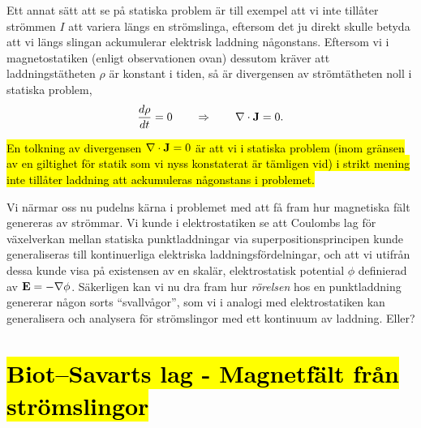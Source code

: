 Ett annat s{\"a}tt att se p{\aa} statiska problem {\"a}r till exempel att vi
inte till{\aa}ter str{\"o}mmen $I$ att variera l{\"a}ngs en str{\"o}mslinga,
eftersom det ju direkt skulle betyda att vi l{\"a}ngs slingan ackumulerar
elektrisk laddning n{\aa}gonstans. Eftersom vi i magnetostatiken (enligt
observationen ovan) dessutom kr{\"a}ver att laddningst{\"a}theten $\rho$
{\"a}r konstant i tiden, s{\aa} {\"a}r divergensen av str{\"o}mt{\"a}theten
noll i statiska problem,
\hl{$$
  {{d\rho}\over{dt}}=0\qquad\Rightarrow\qquad\nabla\cdot{\bf J}=0.
$$}
{\hl{En tolkning av divergensen $\nabla\cdot{\bf J}=0$ {\"a}r att vi i statiska
problem (inom gr{\"a}nsen av en giltighet f{\"o}r statik som vi nyss
konstaterat {\"a}r t{\"a}mligen vid) i strikt mening inte till{\aa}ter
laddning att ackumuleras n{\aa}gonstans i problemet.}

Vi n{\"a}rmar oss nu pudelns k{\"a}rna i problemet med att f{\aa} fram hur
magnetiska f{\"a}lt genereras av str{\"o}mmar.
Vi kunde i elektrostatiken se att Coulombs lag f{\"o}r v{\"a}xelverkan mellan
statiska punktladdningar
via superpositionsprincipen kunde generaliseras till kontinuerliga elektriska
laddningsf{\"o}rdelningar, och att vi utifr{\aa}n dessa kunde visa p{\aa}
existensen av en skal{\"a}r, elektrostatisk potential $\phi$ definierad av
${\bf E}=-\nabla\phi$. S{\"a}kerligen kan vi nu dra fram hur {\it r{\"o}relsen}
hos en punktladdning genererar n{\aa}gon sorts ``svallv{\aa}gor'', som vi i
analogi med elektrostatiken kan generalisera och analysera f{\"o}r
str{\"o}mslingor med ett kontinuum av laddning. Eller?
\vfill\eject

\section{{\hl{Biot--Savarts lag - Magnetf{\"a}lt fr{\aa}n str{\"o}mslingor}}}
}
